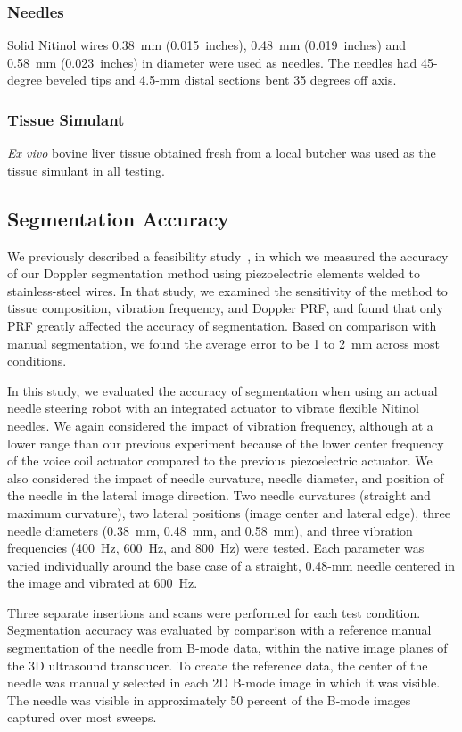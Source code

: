 \subsubsection{Needles}
Solid Nitinol wires 0.38~mm (0.015~inches), 0.48~mm (0.019~inches) and 0.58~mm (0.023~inches) in diameter were used as needles. The needles had 45-degree beveled tips and 4.5-mm distal sections bent 35 degrees off axis.

\subsubsection{Tissue Simulant}
\textit{Ex vivo} bovine liver tissue obtained fresh from a local butcher was used as the tissue simulant in all testing.

\subsection{Segmentation Accuracy}
We previously described a feasibility study~\cite{Adebar2013}, in which we measured the accuracy of our Doppler segmentation method using piezoelectric elements welded to stainless-steel wires. In that study, we examined the sensitivity of the method to tissue composition, vibration frequency, and Doppler PRF, and found that only PRF greatly affected the accuracy of segmentation. Based on comparison with manual segmentation, we found the average error to be 1 to 2~mm across most conditions.

In this study, we evaluated the accuracy of segmentation when using an actual needle steering robot with an integrated actuator to vibrate flexible Nitinol needles. We again considered the impact of vibration frequency, although at a lower range than our previous experiment because of the lower center frequency of the voice coil actuator compared to the previous piezoelectric actuator. We also considered the impact of needle curvature, needle diameter, and position of the needle in the lateral image direction. Two needle curvatures (straight and maximum curvature), two lateral positions (image center and lateral edge), three needle diameters (0.38~mm, 0.48~mm, and 0.58~mm), and three vibration frequencies (400~Hz, 600~Hz, and 800~Hz) were tested. Each parameter was varied individually around the base case of a straight, 0.48-mm needle centered in the image and vibrated at 600~Hz. 

Three separate insertions and scans were performed for each test condition. Segmentation accuracy was evaluated by comparison with a reference manual segmentation of the needle from B-mode data, within the native image planes of the 3D ultrasound transducer. To create the reference data, the center of the needle was manually selected in each 2D B-mode image in which it was visible. The needle was visible in approximately 50 percent of the B-mode images captured over most sweeps. 

